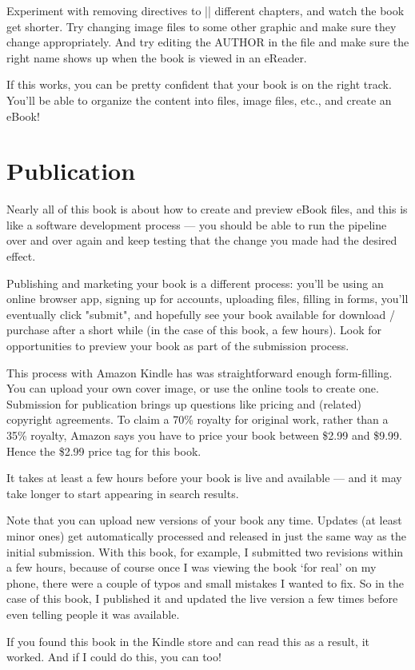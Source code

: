 Experiment with removing directives to \sverb|| different chapters, and watch the book get shorter. Try changing image files to some other graphic
and make sure they change appropriately. And try editing the AUTHOR in the  file and make sure the right name shows up when the book is viewed in an eReader.

If this works, you can be pretty confident that your book is on the right track. You'll be able to organize the content into \tex files, image files, etc., and create an eBook!


\section{Publication}

Nearly all of this book is about how to create and preview eBook files, and this is like a software development process
--- you should be able to run the pipeline over and over again and keep testing that the change you made had the desired effect.

Publishing and marketing your book is a different process: you'll be using an online browser app, signing up for accounts, uploading files, filling in forms,
you'll eventually click "submit", and hopefully see your book available for download / purchase after a short while (in the case of this book, a few hours).
Look for opportunities to preview your book as part of the submission process.

This process with Amazon Kindle has was straightforward enough form-filling. You can upload your own cover image, or use the online tools
to create one. Submission for publication brings up questions like pricing and (related) copyright agreements. To claim a 70\% royalty for original work,
rather than a 35\% royalty, Amazon says you have to price your book between \$2.99 and \$9.99. Hence the \$2.99 price tag for this book.

It takes at least a few hours before your book is live and available --- and it may take longer to start appearing in search results.

Note that you can upload new versions of your book any time. Updates (at least minor ones) get automatically processed and released
in just the same way as the initial submission. With this book, for example, I submitted two revisions within a few hours, because of
course once I was viewing the book `for real' on my phone, there were a couple of typos and small mistakes I wanted to fix.
So in the case of this book, I published it and updated the live version a few times before even telling people it was available.

If you found this book in the Kindle store and can read this as a result, it worked. And if I could do this, you can too!





